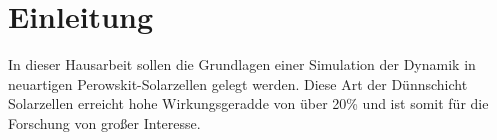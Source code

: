 \chapter{Einleitung}
In dieser Hausarbeit sollen die Grundlagen einer Simulation der Dynamik in neuartigen Perowskit-Solarzellen gelegt werden. Diese Art der Dünnschicht Solarzellen erreicht hohe Wirkungsgeradde von über  20\% und ist somit für die Forschung von großer Interesse\cite{Prof.Dr.AndreasZeiser.April2021}.  



